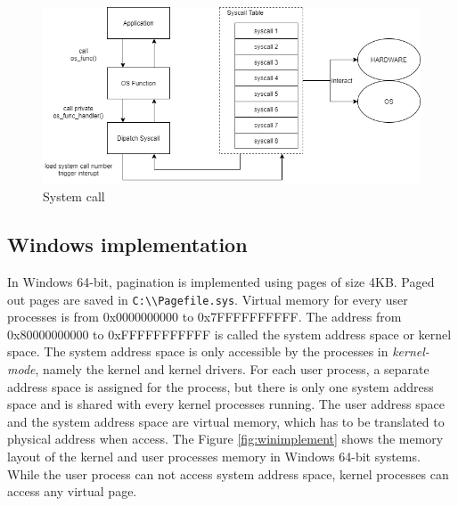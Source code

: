 \begin{figure}[h]
  \centering
  \caption{System call}
  \label{fig:syscall}
  \includegraphics[scale=0.7]{images/syscall.png}
\end{figure}

\subsection[Windows implementation]{Windows implementation}

In Windows 64-bit, pagination is implemented using pages of size 4KB.  Paged
out pages are saved in \texttt{C:\textbackslash\textbackslash Pagefile.sys}.
Virtual memory for every user processes is from 0x0000000000 to 0x7FFFFFFFFFF.
The address from 0x80000000000 to 0xFFFFFFFFFFF is called the system address
space or kernel space.  The system address space is only accessible by the
processes in \textit{kernel-mode}, namely the kernel and kernel drivers.  For
each user process, a separate address space is assigned for the process, but
there is only one system address space and is shared with every kernel
processes running. The user address space and the system address space are
virtual memory, which has to be translated to physical address when access. The
Figure \ref{fig:winimplement} shows the memory layout of the kernel and user
processes memory in Windows 64-bit systems. While the user process can not
access system address space, kernel processes can access any virtual page.

